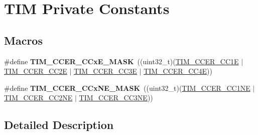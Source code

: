 \hypertarget{group___t_i_m___private___constants}{}\section{T\+IM Private Constants}
\label{group___t_i_m___private___constants}
\subsection*{Macros}
\begin{DoxyCompactItemize}
\item 
\mbox{\label{group___t_i_m___private___constants_ga5d1a1d755cda12637dfa5143130b4891}} 
\#define {\bfseries T\+I\+M\+\_\+\+C\+C\+E\+R\+\_\+\+C\+Cx\+E\+\_\+\+M\+A\+SK}~((uint32\+\_\+t)(\mbox{\hyperlink{group___peripheral___registers___bits___definition_ga3f494b9881e7b97bb2d79f7ad4e79937}{T\+I\+M\+\_\+\+C\+C\+E\+R\+\_\+\+C\+C1E}} $\vert$ \mbox{\hyperlink{group___peripheral___registers___bits___definition_ga76392a4d63674cd0db0a55762458f16c}{T\+I\+M\+\_\+\+C\+C\+E\+R\+\_\+\+C\+C2E}} $\vert$ \mbox{\hyperlink{group___peripheral___registers___bits___definition_ga1da114e666b61f09cf25f50cdaa7f81f}{T\+I\+M\+\_\+\+C\+C\+E\+R\+\_\+\+C\+C3E}} $\vert$ \mbox{\hyperlink{group___peripheral___registers___bits___definition_ga940b041ab5975311f42f26d314a4b621}{T\+I\+M\+\_\+\+C\+C\+E\+R\+\_\+\+C\+C4E}}))
\item 
\mbox{\label{group___t_i_m___private___constants_gaeae61652a005098f9fe6b398d29d4279}} 
\#define {\bfseries T\+I\+M\+\_\+\+C\+C\+E\+R\+\_\+\+C\+Cx\+N\+E\+\_\+\+M\+A\+SK}~((uint32\+\_\+t)(\mbox{\hyperlink{group___peripheral___registers___bits___definition_ga813056b3f90a13c4432aeba55f28957e}{T\+I\+M\+\_\+\+C\+C\+E\+R\+\_\+\+C\+C1\+NE}} $\vert$ \mbox{\hyperlink{group___peripheral___registers___bits___definition_ga6a784649120eddec31998f34323d4156}{T\+I\+M\+\_\+\+C\+C\+E\+R\+\_\+\+C\+C2\+NE}} $\vert$ \mbox{\hyperlink{group___peripheral___registers___bits___definition_gad46cce61d3bd83b64257ba75e54ee1aa}{T\+I\+M\+\_\+\+C\+C\+E\+R\+\_\+\+C\+C3\+NE}}))
\end{DoxyCompactItemize}


\subsection{Detailed Description}
